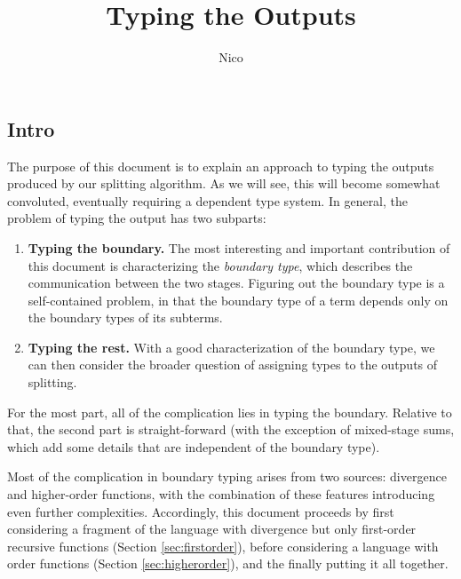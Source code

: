 \documentclass[]{article}
\title{Typing the Outputs}
\author{Nico}
\begin{document}
\maketitle

\begin{abstrsyn}

\newcommand {\colfun} [3] {{#1}:>{#2}~\myatsign~{#3}}

\newcommand {\ibksym} {\rotatebox[origin=c]{270}{$\therefore$}}
\newcommand {\btsym} {\rotatebox[origin=c]{270}{$\triangle$}}
\newcommand {\ktype} {\rm Type}
\newcommand {\ibk} [2] {{#1}~\ibksym~{#2}}
\newcommand {\btj} [4] {{#1}:{#2}~\myatsign~{#3}~\btsym~{#4}}
\newcommand {\btyo} [4] [\Gamma] {{#1}\vdash \btj{#2}{#3}\bbone{#4}}
\newcommand {\btyt} [4] [\Gamma] {{#1}\vdash \btj{#2}{#3}\bbtwo{#4}}
\newcommand {\btyw} [4] [\Gamma] {{#1}\vdash \btj{#2}{#3}w{#4}}
\newcommand {\btysub} [2] [] {\bty{e_{#1}:{#2}}{\tau_{#1}}{\sigma_{#1}}}

\section {Intro}

The purpose of this document is to explain an approach to typing the outputs produced by our splitting algorithm.
As we will see, this will become somewhat convoluted, eventually requiring a dependent type system.
In general, the problem of typing the output has two subparts:
\begin{enumerate}
\item \textbf{Typing the boundary.}  The most interesting and important contribution of this document is characterizing the 
\emph{boundary type}, which describes the communication between the two stages.  
Figuring out the boundary type is a self-contained problem, 
in that the boundary type of a term depends only on the boundary types of its subterms.

\item \textbf{Typing the rest.}  With a good characterization of the boundary type,
we can then consider the broader question of assigning types to the outputs of splitting.
\end{enumerate}

For the most part, all of the complication lies in typing the boundary.
Relative to that, the second part is straight-forward 
(with the exception of mixed-stage sums, which add some details that are independent of the boundary type).

Most of the complication in boundary typing arises from two sources: divergence and higher-order functions,
with the combination of these features introducing even further complexities.
Accordingly, this document proceeds by first considering a fragment of the language with
divergence but only first-order recursive functions (Section \ref{sec:firstorder}),
before considering a language with order functions (Section \ref{sec:higherorder}),
and the finally putting it all together.


\end{abstrsyn}
\end{document}
